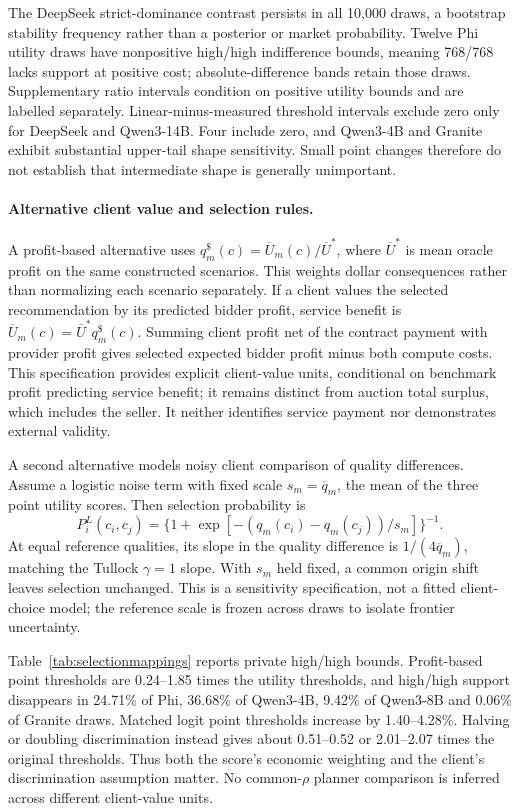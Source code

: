 \documentclass{article}
\begin{document}
The DeepSeek strict-dominance contrast persists in all 10,000 draws, a bootstrap stability frequency rather than a posterior or market probability. Twelve Phi utility draws have nonpositive high/high indifference bounds, meaning 768/768 lacks support at positive cost; absolute-difference bands retain those draws. Supplementary ratio intervals condition on positive utility bounds and are labelled separately. Linear-minus-measured threshold intervals exclude zero only for DeepSeek and Qwen3-14B. Four include zero, and Qwen3-4B and Granite exhibit substantial upper-tail shape sensitivity. Small point changes therefore do not establish that intermediate shape is generally unimportant.

\paragraph{Alternative client value and selection rules.}
A profit-based alternative uses $q_m^{\$}(c)=\overline U_m(c)/\overline U^*$, where $\overline U^*$ is mean oracle profit on the same constructed scenarios. This weights dollar consequences rather than normalizing each scenario separately. If a client values the selected recommendation by its predicted bidder profit, service benefit is $\overline U_m(c)=\overline U^*q_m^{\$}(c)$. Summing client profit net of the contract payment with provider profit gives selected expected bidder profit minus both compute costs. This specification provides explicit client-value units, conditional on benchmark profit predicting service benefit; it remains distinct from auction total surplus, which includes the seller. It neither identifies service payment nor demonstrates external validity.

A second alternative models noisy client comparison of quality differences. Assume a logistic noise term with fixed scale $s_m=\overline q_m$, the mean of the three point utility scores. Then selection probability is
\[
P_i^{L}(c_i,c_j)=\{1+\exp[-(q_m(c_i)-q_m(c_j))/s_m]\}^{-1}.
\]
At equal reference qualities, its slope in the quality difference is $1/(4\overline q_m)$, matching the Tullock $\gamma=1$ slope. With $s_m$ held fixed, a common origin shift leaves selection unchanged. This is a sensitivity specification, not a fitted client-choice model; the reference scale is frozen across draws to isolate frontier uncertainty.

Table~\ref{tab:selectionmappings} reports private high/high bounds. Profit-based point thresholds are 0.24--1.85 times the utility thresholds, and high/high support disappears in 24.71\% of Phi, 36.68\% of Qwen3-4B, 9.42\% of Qwen3-8B and 0.06\% of Granite draws. Matched logit point thresholds increase by 1.40--4.28\%. Halving or doubling discrimination instead gives about 0.51--0.52 or 2.01--2.07 times the original thresholds. Thus both the score's economic weighting and the client's discrimination assumption matter. No common-$\rho$ planner comparison is inferred across different client-value units.

\end{document}

